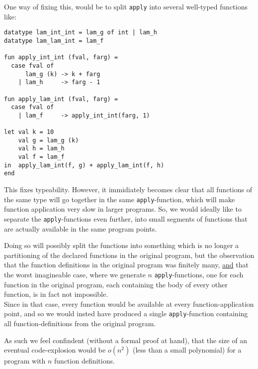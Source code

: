 One way of fixing this, would be to split {\tt apply} into several well-typed
functions like:
\begin{verbatim}
datatype lam_int_int = lam_g of int | lam_h
datatype lam_lam_int = lam_f

fun apply_int_int (fval, farg) =
  case fval of
      lam_g (k) -> k + farg
    | lam_h     -> farg - 1

fun apply_lam_int (fval, farg) =
  case fval of
    | lam_f     -> apply_int_int(farg, 1)

let val k = 10
    val g = lam_g (k)
    val h = lam_h
    val f = lam_f
in  apply_lam_int(f, g) + apply_lam_int(f, h)
end
\end{verbatim}
This fixes typeability.
However, it immidiately becomes clear that all functions of the same type
will go together in the same {\tt apply}-function, which will make function
application very slow in larger programs.
So, we would ideally like to separate the {\tt apply}-functions
even further, into small segments of functions that are actually available
in the same program points.

Doing so will possibly split the functions into something which is no
longer a partitioning of the declared functions in the original program,
but the observation that the function definitions in the original program
was finitely many, \underline{and} that the worst imagineable case,
where we generate $n$ {\tt apply}-functions, one for each function
in the original program, each containing the body of every other function,
is in fact not impossible.\\
Since in that case, every function would be available at every function-application
point, and so we would insted have produced a single {\tt apply}-function
containing all function-definitions from the original program.

As such we feel confindent (without a formal proof at hand),
that the size of an eventual code-explosion would be $o(n^2)$
(less than a small polynomial) for a program with $n$ function definitions.

